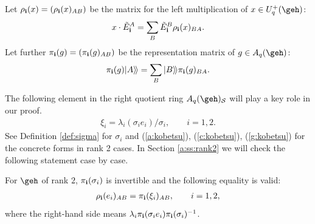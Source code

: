 Let $\rho_{\bf i}(x)=(\rho_{\bf i}(x)_{A B})$ be the matrix
for the left multiplication of  $x \in U^+_q(\geh)$:
\begin{gather}\label{a:lmul}
x \cdot {\tilde E}^{A}_{\bf i} = \sum_B  {\tilde E}^B_{\bf i}
\rho_{\bf i}(x)_{BA}.
\end{gather}
Let further $\pi_{\bf i}(g)=(\pi_{\bf i}(g)_{A B})$ be the
representation matrix of $g \in A_q(\geh)$:
\begin{gather}\label{a:pib}
\pi_{\bf i}(g) | A\rangle\!\rangle
= \sum_B |B\rangle\!\rangle \pi_{\bf i}(g)_{BA}.
\end{gather}

The following element in
the right quotient ring $A_q(\geh)_\mathcal{S}$
will play a key role in our proof.
\begin{gather}\label{a:xidef}
\xi_i = \lambda_i (\sigma_i e_i)/\sigma_i,\qquad i=1,2.
\end{gather}
See Def\/inition \ref{def:sigma} for $\sigma_i$
and (\ref{a:kobetsu}),  (\ref{c:kobetsu}),  (\ref{g:kobetsu})
for the concrete forms in rank 2 cases.
In Section \ref{a:ss:rank2} we will check
the following statement case by case.
\begin{proposition}\label{a:pr:rnk2}
For $\geh$ of rank $2$,
$\pi_{\bf i}(\sigma_i)$ is invertible and
the following equality is valid:
\begin{gather}\label{a:key}
\rho_{\bf i}(e_i)_{A B} = \pi_{\bf i}(\xi_i)_{A B}, \qquad i=1,2,
\end{gather}
where the right-hand side means
$\lambda_i\pi_{\bf i}(\sigma_ie_i) \pi_{\bf i}(\sigma_i)^{-1}$.
\end{proposition}

